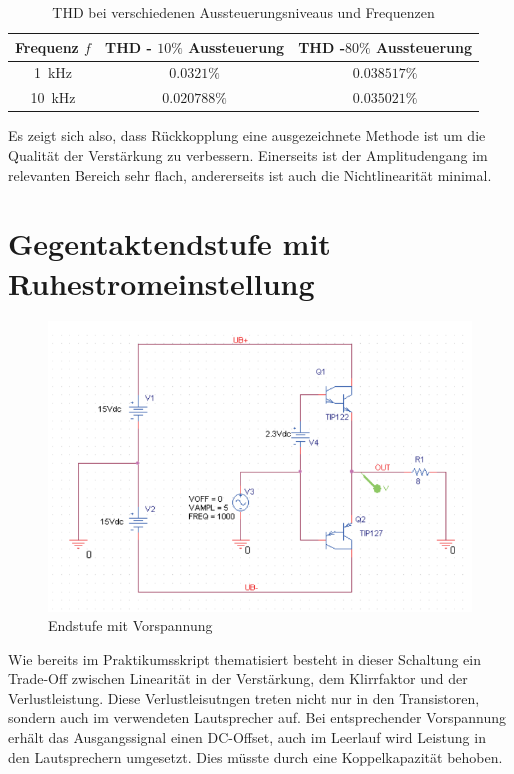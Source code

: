 \begin{table}[H]
    \centering
    \begin{tabular}{|c||c||c|} \hline
         {Frequenz $f$} & {THD - $10\%$ Aussteuerung} & {THD -$80\%$ Aussteuerung} \\ \hline \hline
         \SI{1}{\kilo \hertz}& $0.0321\%$  & $0.038517\%$ \\ \hline
         \SI{10}{\kilo \hertz}& $0.020788\%$  & $0.035021\%$ \\ \hline
    \end{tabular}
    \caption{THD bei verschiedenen Aussteuerungsniveaus und Frequenzen}
    \label{tab:my_label}
\end{table}

Es zeigt sich also, dass Rückkopplung eine ausgezeichnete Methode ist um die Qualität der Verstärkung zu verbessern. Einerseits ist der Amplitudengang im relevanten Bereich sehr flach, andererseits ist auch die Nichtlinearität minimal.

\section{Gegentaktendstufe mit Ruhestromeinstellung}

\begin{figure}[H]
    \centering
    \includegraphics{tex/7_Leistungsverstaerker/pictures/Endstufe_Vorspannung_Schaltung.png}
    \caption{Endstufe mit Vorspannung}
    \label{fig:my_label}
\end{figure}

Wie bereits im Praktikumsskript thematisiert besteht in dieser Schaltung ein Trade-Off zwischen Linearität in der Verstärkung, dem Klirrfaktor und der Verlustleistung. Diese Verlustleisutngen treten nicht nur in den Transistoren, sondern auch im verwendeten Lautsprecher auf. Bei entsprechender Vorspannung erhält das Ausgangssignal einen DC-Offset, auch im Leerlauf wird Leistung in den Lautsprechern umgesetzt. Dies müsste durch eine Koppelkapazität behoben. 

